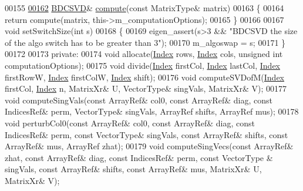 \begin{DoxyCode}
00155 
\hyperlink{group___s_v_d___module_acf27f41ed044d74ea8e8cbaf17ffdb04}{00162}   \hyperlink{group___s_v_d___module_class_eigen_1_1_b_d_c_s_v_d}{BDCSVD}& \hyperlink{group___s_v_d___module_acf27f41ed044d74ea8e8cbaf17ffdb04}{compute}(\textcolor{keyword}{const} MatrixType& matrix)
00163   \{
00164     \textcolor{keywordflow}{return} compute(matrix, this->m\_computationOptions);
00165   \}
00166 
00167   \textcolor{keywordtype}{void} setSwitchSize(\textcolor{keywordtype}{int} s) 
00168   \{
00169     eigen\_assert(s>3 && \textcolor{stringliteral}{"BDCSVD the size of the algo switch has to be greater than 3"});
00170     m\_algoswap = s;
00171   \}
00172  
00173 \textcolor{keyword}{private}:
00174   \textcolor{keywordtype}{void} allocate(\hyperlink{namespace_eigen_a62e77e0933482dafde8fe197d9a2cfde}{Index} rows, \hyperlink{namespace_eigen_a62e77e0933482dafde8fe197d9a2cfde}{Index} cols, \textcolor{keywordtype}{unsigned} \textcolor{keywordtype}{int} computationOptions);
00175   \textcolor{keywordtype}{void} divide(\hyperlink{namespace_eigen_a62e77e0933482dafde8fe197d9a2cfde}{Index} firstCol, \hyperlink{namespace_eigen_a62e77e0933482dafde8fe197d9a2cfde}{Index} lastCol, \hyperlink{namespace_eigen_a62e77e0933482dafde8fe197d9a2cfde}{Index} firstRowW, 
      \hyperlink{namespace_eigen_a62e77e0933482dafde8fe197d9a2cfde}{Index} firstColW, \hyperlink{namespace_eigen_a62e77e0933482dafde8fe197d9a2cfde}{Index} shift);
00176   \textcolor{keywordtype}{void} computeSVDofM(\hyperlink{namespace_eigen_a62e77e0933482dafde8fe197d9a2cfde}{Index} firstCol, \hyperlink{namespace_eigen_a62e77e0933482dafde8fe197d9a2cfde}{Index} n, MatrixXr& U, VectorType& singVals, MatrixXr& V);
00177   \textcolor{keywordtype}{void} computeSingVals(\textcolor{keyword}{const} ArrayRef& col0, \textcolor{keyword}{const} ArrayRef& diag, \textcolor{keyword}{const} IndicesRef& perm, VectorType& 
      singVals, ArrayRef shifts, ArrayRef mus);
00178   \textcolor{keywordtype}{void} perturbCol0(\textcolor{keyword}{const} ArrayRef& col0, \textcolor{keyword}{const} ArrayRef& diag, \textcolor{keyword}{const} IndicesRef& perm, \textcolor{keyword}{const} VectorType& 
      singVals, \textcolor{keyword}{const} ArrayRef& shifts, \textcolor{keyword}{const} ArrayRef& mus, ArrayRef zhat);
00179   \textcolor{keywordtype}{void} computeSingVecs(\textcolor{keyword}{const} ArrayRef& zhat, \textcolor{keyword}{const} ArrayRef& diag, \textcolor{keyword}{const} IndicesRef& perm, \textcolor{keyword}{const} VectorType
      & singVals, \textcolor{keyword}{const} ArrayRef& shifts, \textcolor{keyword}{const} ArrayRef& mus, MatrixXr& U, MatrixXr& V);

\end{DoxyCode}
